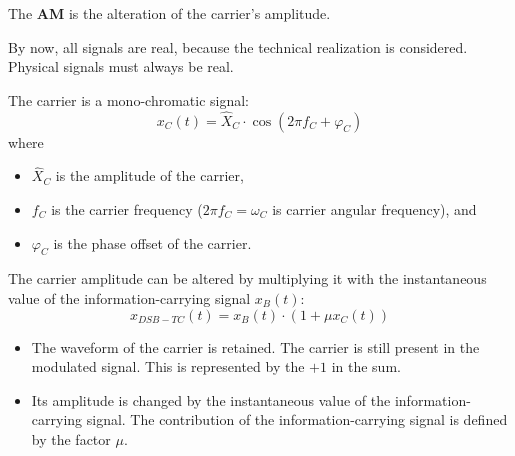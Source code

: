 \begin{refsection}
The  \textbf{\ac{AM}} is the alteration of the carrier's amplitude.

\begin{attention}
	By now, all signals are real, because the technical realization is considered. Physical signals must always be real.
\end{attention}

The carrier is a mono-chromatic signal:
\begin{equation}
	x_C(t) = \hat{X}_C \cdot \cos\left(2\pi f_C + \varphi_C\right)
\end{equation}
where
\begin{itemize}
	\item $\hat{X}_C$ is the amplitude of the carrier,
	\item $f_C$ is the carrier frequency ($2\pi f_C = \omega_C$ is carrier angular frequency), and
	\item $\varphi_C$ is the phase offset of the carrier.
\end{itemize}

The carrier amplitude can be altered by multiplying it with the instantaneous value of the information-carrying signal $x_B(t)$:
\begin{equation}
	x_{DSB-TC}(t) = x_B(t) \cdot \left(1 + \mu x_C(t)\right)
	\label{eq:ch05:amdsb_timedomain}
\end{equation}
\begin{itemize}
	\item The waveform of the carrier is retained. The carrier is still present in the modulated signal. This is represented by the $+1$ in the sum.
	\item Its amplitude is changed by the instantaneous value of the information-carrying signal. The contribution of the information-carrying signal is defined by the factor $\mu$.
\end{itemize}

\begin{figure}[H]
	\centering
	

\end{figure}
\end{refsection}
